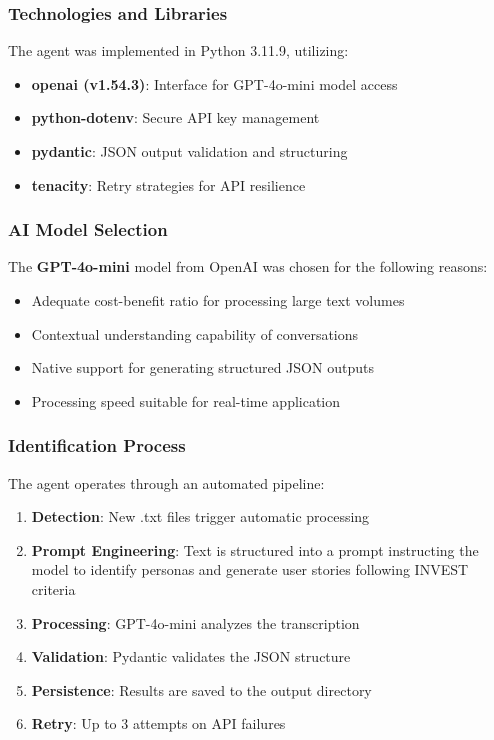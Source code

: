 \documentclass[12pt]{article}
\begin{document}
\subsubsection{Technologies and Libraries}

The agent was implemented in Python 3.11.9, utilizing:

\begin{itemize}
    \item \textbf{openai (v1.54.3)}: Interface for GPT-4o-mini model access
    \item \textbf{python-dotenv}: Secure API key management
    \item \textbf{pydantic}: JSON output validation and structuring
    \item \textbf{tenacity}: Retry strategies for API resilience
\end{itemize}

\subsubsection{AI Model Selection}

The \textbf{GPT-4o-mini} model from OpenAI was chosen for the following reasons:

\begin{itemize}
    \item Adequate cost-benefit ratio for processing large text volumes
    \item Contextual understanding capability of conversations
    \item Native support for generating structured JSON outputs
    \item Processing speed suitable for real-time application
\end{itemize}

\subsubsection{Identification Process}

The agent operates through an automated pipeline:

\begin{enumerate}
    \item \textbf{Detection}: New .txt files trigger automatic processing
    \item \textbf{Prompt Engineering}: Text is structured into a prompt instructing the model to identify personas and generate user stories following INVEST criteria
    \item \textbf{Processing}: GPT-4o-mini analyzes the transcription
    \item \textbf{Validation}: Pydantic validates the JSON structure
    \item \textbf{Persistence}: Results are saved to the output directory
    \item \textbf{Retry}: Up to 3 attempts on API failures
\end{enumerate}
\end{document}
